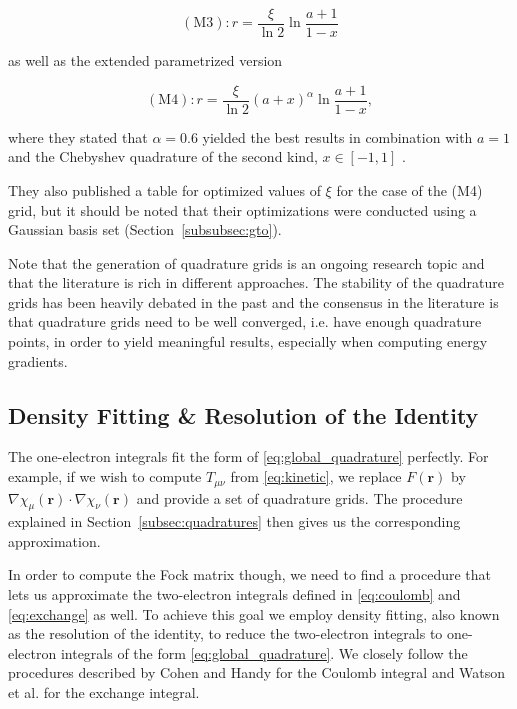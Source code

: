 \documentclass{article}
\begin{document}
\begin{equation}
  (\text{M3}) : r = \frac{\xi}{\ln 2} \ln \frac{a+1}{1-x}
  \label{eq:M3}
\end{equation}

as well as the extended parametrized version

\begin{equation}
  (\text{M4}) : r = \frac{\xi}{\ln 2} (a+x)^\alpha \ln \frac{a+1}{1-x},
  \label{eq:M4}
\end{equation}

where they stated that $\alpha = 0.6$ yielded the best results in
combination with $a = 1$ and the Chebyshev quadrature of the second
kind, $x\in[-1 ,1]$ .

They also published a table for optimized values of $\xi$ for the
case of the (M4) grid, but it should be noted that their
optimizations were conducted using a Gaussian basis set
(Section~\ref{subsubsec:gto}).

Note that the generation of quadrature grids is an
ongoing research topic and that the literature is rich in different
approaches.\cite{Becke_1988, Gill1993, Murray_1993, Goursot1994,
  Johnson1994, Treutler1995, Mura_1996,
  adaptivenumericalintegratorformolecularintegrals1998, Gill2003,
Efficient2004} The stability of the quadrature grids has been
heavily debated in the past and the consensus in the literature is
that quadrature grids need to be well converged, i.e. have enough
quadrature points, in order to yield meaningful results, especially
when computing energy gradients.\cite{Johnson_1993, Baker1994, Papas2006}

\subsection{Density Fitting \& Resolution of the
Identity}\label{subsec:density_fitting}

The one-electron integrals fit the form of
\eqref{eq:global_quadrature} perfectly. For example, if we wish to
compute $T_{\mu\nu}$ from \eqref{eq:kinetic}, we replace $F(\mathbf
r)$ by $\nabla \chi_\mu (\mathbf r) \cdot \nabla \chi_\nu(\mathbf r)$
and provide a set of quadrature grids. The procedure explained in
Section~\ref{subsec:quadratures} then gives us the corresponding approximation.

In order to compute the Fock matrix though, we need to find a procedure
that lets us approximate the two-electron integrals defined in
\eqref{eq:coulomb} and \eqref{eq:exchange} as well. To achieve this
goal we employ density fitting, also known as the resolution
of the identity, to reduce the two-electron integrals to one-electron
integrals of the form \eqref{eq:global_quadrature}. We closely follow
the procedures described by Cohen and Handy \cite{Cohen2002} for the
Coulomb integral and Watson et al.  \cite{Watson2003}  for the
exchange integral.
\end{document}
